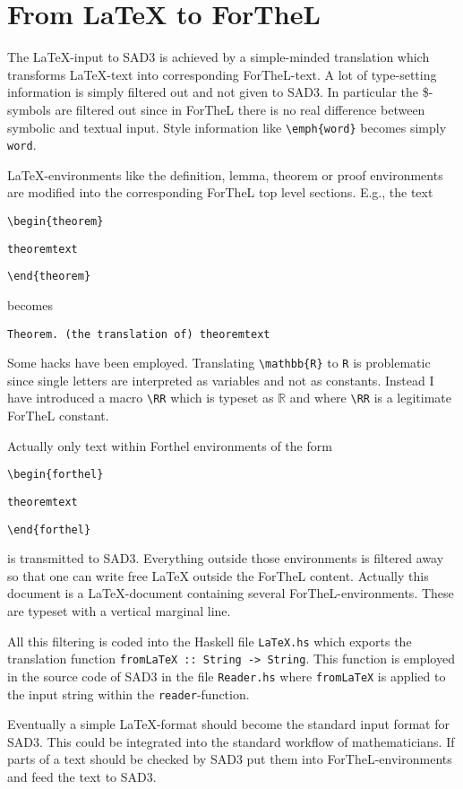 \documentclass{article}
\begin{document}
\section{{From \LaTeX} to ForTheL}
The {\LaTeX}-input to SAD3 is achieved by a simple-minded translation which transforms {\LaTeX}-text into corresponding ForTheL-text. A lot of type-setting information is simply filtered out and not given to SAD3. In particular the {\$}-symbols are filtered out since in ForTheL there is no real difference between symbolic and textual input. Style information like {\tt \textbackslash emph\{word\}} becomes simply {\tt word}.

{\LaTeX}-environments like the definition, lemma, theorem or proof environments are modified into the corresponding ForTheL top level sections. E.g., the text

{\tt \textbackslash begin\{theorem\}}

{\tt theoremtext}

{\tt \textbackslash end\{theorem\}}

becomes

{\tt Theorem. (the translation of) theoremtext}

Some hacks have been employed. Translating 
{\tt \textbackslash mathbb\{R\}} to {\tt R} is problematic since single letters are interpreted as variables and not as constants. Instead I have introduced a macro {\tt \textbackslash RR} which is typeset as $\mathbb{R}$ and where {\tt \textbackslash RR} is a legitimate ForTheL constant.

Actually only text within Forthel environments of the form

{\tt \textbackslash begin\{forthel\}}

{\tt theoremtext}

{\tt \textbackslash end\{forthel\}}

is transmitted to SAD3. Everything outside those environments is filtered away so that one can write free {\LaTeX} outside the ForTheL content. Actually this document is a {\LaTeX}-document containing several ForTheL-environments. These are typeset with a vertical marginal line.

All this filtering is coded into the Haskell file
{\tt LaTeX.hs} which exports the translation function
{\tt fromLaTeX :: String -> String}.
This function is employed in the source code of SAD3 in the file
{\tt Reader.hs} where {\tt fromLaTeX} is applied to the input string within the {\tt reader}-function.

Eventually a simple {\LaTeX}-format should become the standard input format for SAD3. This could be integrated into the standard workflow of mathematicians. If parts of a text should be checked by SAD3 put them into ForTheL-environments and feed the text to SAD3.
\end{document}

